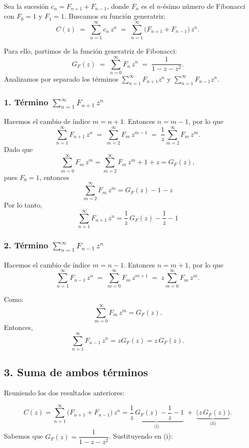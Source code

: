 \begin{solution}
    Sea la sucesi\'on \(c_n = F_{n+1} + F_{n-1}\), donde \(F_n\) es el \(n\)-\'esimo n\'umero de Fibonacci con \(F_0 = 1\) y \(F_1 = 1\).  
Buscamos su funci\'on generatriz:
\[
C(z) \;=\; \sum_{n=1}^{\infty} c_n \, z^n 
\;=\; \sum_{n=1}^{\infty} \bigl(F_{n+1} + F_{n-1}\bigr)\,z^n.
\]

Para ello, partimos de la funci\'on generatriz de Fibonacci:
\[
G_F(z) \;=\; \sum_{n=0}^{\infty} F_n \, z^n 
\;=\; \frac{1}{1 - z - z^2}.
\]
Analizamos por separado los t\'erminos \(\sum_{n=1}^{\infty} F_{n+1} z^n\) y \(\sum_{n=1}^{\infty} F_{n-1} z^n\).

\subsubsection*{1. T\'ermino \(\displaystyle \sum_{n=1}^{\infty} F_{n+1}\, z^n\)}
Hacemos el cambio de \'indice \(m = n + 1\). Entonces \(n = m - 1\), por lo que
\[
\sum_{n=1}^{\infty} F_{n+1} \,z^n
\;=\;
\sum_{m=2}^{\infty} F_m \, z^{m-1}
\;=\;
\frac{1}{z} \sum_{m=2}^{\infty} F_m \, z^m.
\]
Dado que
\[
\sum_{m=0}^{\infty} F_m \, z^m = \sum_{m=2}^{\infty} F_m  \, z^m +1 +z  =  G_F(z),
\]
pues \(F_0 = 1\), entonces
\[
\sum_{m=2}^{\infty} F_m \, z^m = G_F(z) - 1-z
\]
Por lo tanto,
\[
\sum_{n=1}^{\infty} F_{n+1} \,z^n 
= \frac{1}{z}\,G_F(z)- \frac1z - 1
\]

\subsubsection*{2. T\'ermino \(\displaystyle \sum_{n=1}^{\infty} F_{n-1}\, z^n\)}
Hacemos el cambio de \'indice \(m = n - 1\). Entonces \(n = m + 1\), por lo que
\[
\sum_{n=1}^{\infty} F_{n-1} \, z^n
\;=\;
\sum_{m=0}^{\infty} F_{m} \, z^{m+1}
\;=\;
z \sum_{m=0}^{\infty} F_m \, z^m.
\]

Como:
\[
 \sum_{m=0}^{\infty} F_m \, z^m
=  G_F(z).
\]
Entonces,
\[
\sum_{n=1}^{\infty} F_{n-1}\, z^n
= z G_F(z)
= z\, G_F(z).
\]

\subsection*{3. Suma de ambos t\'erminos}
Reuniendo los dos resultados anteriores:

\[
C(z)
= \sum_{n=1}^{\infty} \bigl(F_{n+1} + F_{n-1}\bigr)\, z^n
= \underbrace{\frac{1}{z}\, G_F(z)-\frac1 z -1}_{\text{(i)}}
\;+\;
\underbrace{\bigl(z\, G_F(z)\bigr)}_{\text{(ii)}}.
\]
Sabemos que \(G_F(z) = \dfrac{1}{1 - z - z^2}\). Sustituyendo en (i):


\end{solution}
